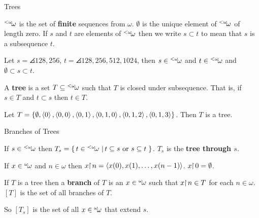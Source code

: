\documentclass[pdf,final]{prosper}
\newcommand{\skipsmall}{\vspace{1em}}
\begin{document}
\begin{slide}{Trees}
\begin{definition}
${}^{<\omega}\!{\omega}$ is the set of \textbf{finite} sequences from $\omega$.
\newline
$\emptyset$ is the unique element of ${}^{<\omega}\!{\omega}$ of length zero.
\newline
If $s$ and $t$ are elements of ${}^{<\omega}\!{\omega}$ then we write $s\subset t$ to mean
that $s$ is a subsequence $t$.
\end{definition}

\skipsmall

\begin{example}
Let $s=\angles{128,256}$, $t=\angles{128,256,512,1024}$, then $s\in{}^{<\omega}\!{\omega}$
and $t\in{}^{<\omega}\!{\omega}$ and $\emptyset\subset s\subset t$.
\end{example}

\skipsmall

\begin{definition}
A \textbf{tree} is a set $T\subseteq{}^{<\omega}\!{\omega}$ such that $T$ is closed under
subsequence. That is, if $s\in T$ and $t\subset s$ then $t\in T$.
\end{definition}

\skipsmall

\begin{example}
Let
$T=\left\{\emptyset,\left\langle 0 \right\rangle,\left\langle 0,0 \right\rangle,\left\langle 0,1 \right\rangle,\left\langle 0,1,0 \right\rangle,\left\langle 0,1,2 \right\rangle,\left\langle 0,1,3 \right\rangle\right\}$. 
Then $T$ is a tree.
\end{example}
\end{slide}

\begin{slide}{Branches of Trees}
\begin{definition}
If $s\in{}^{<\omega}\!{\omega}$ then $T_s=\left\{ \, t\in{}^{<\omega}\!{\omega} \, \left| \, t\subseteq s \text{ or }
s\subseteq t \, \right.\right\}$. $T_s$ is the \textbf{tree through $s$}.
\end{definition}

\skipsmall

\begin{definition}
If $x\in{}^{\omega}\!{\omega}$ and $n\in\omega$ then $x\!\!\upharpoonright\! n =
\left\langle x(0),x(1),\dots,x(n-1) \right\rangle$.
\newline$x\!\!\upharpoonright\! 0=\emptyset$.
\end{definition}

\skipsmall

\begin{definition}
If $T$ is a tree then a \textbf{branch} of $T$ is an $x\in{}^{\omega}\!{\omega}$ such that
$x\!\!\upharpoonright\! n \in T$ for each $n\in\omega$.
\newline
$[T]$ is the set of all branches of $T$.
\end{definition}

\skipsmall

So $[T_s]$ is the set of all $x\in{}^{\omega}\!{\omega}$ that extend $s$.


\end{slide}
\end{document}
